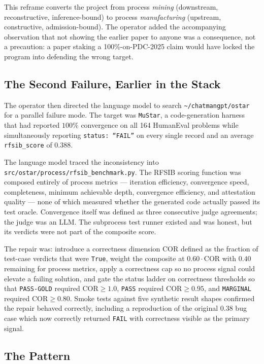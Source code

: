 \documentclass[11pt,letterpaper]{article}
\begin{document}
This reframe converts the project from process \emph{mining} (downstream, reconstructive, inference-bound) to process \emph{manufacturing} (upstream, constructive, admission-bound). The operator added the accompanying observation that not showing the earlier paper to anyone was a consequence, not a precaution: a paper staking a 100\%-on-PDC-2025 claim would have locked the program into defending the wrong target.

\subsection{The Second Failure, Earlier in the Stack}

The operator then directed the language model to search \texttt{\textasciitilde/chatmangpt/ostar} for a parallel failure mode. The target was \texttt{MuStar}, a code-generation harness that had reported \( 100\% \) convergence on all 164 HumanEval problems while simultaneously reporting \texttt{status: ``FAIL''} on every single record and an average \texttt{rfsib\_score} of \( 0.388 \).

The language model traced the inconsistency into \texttt{src/ostar/process/rfsib\_benchmark.py}. The RFSIB scoring function was composed entirely of process metrics --- iteration efficiency, convergence speed, completeness, minimum achievable depth, convergence efficiency, and attestation quality --- none of which measured whether the generated code actually passed its test oracle. Convergence itself was defined as three consecutive judge agreements; the judge was an LLM. The subprocess test runner existed and was honest, but its verdicts were not part of the composite score.

The repair was: introduce a correctness dimension \(\mathrm{COR}\) defined as the fraction of test-case verdicts that were \texttt{True}, weight the composite at \( 0.60 \cdot \mathrm{COR} \) with \( 0.40 \) remaining for process metrics, apply a correctness cap so no process signal could elevate a failing solution, and gate the status ladder on correctness thresholds so that \texttt{PASS-GOLD} required \(\mathrm{COR} \geq 1.0\), \texttt{PASS} required \(\mathrm{COR} \geq 0.95\), and \texttt{MARGINAL} required \(\mathrm{COR} \geq 0.80\). Smoke tests against five synthetic result shapes confirmed the repair behaved correctly, including a reproduction of the original \( 0.38 \) bug case which now correctly returned \texttt{FAIL} with correctness visible as the primary signal.

\subsection{The Pattern}
\end{document}
